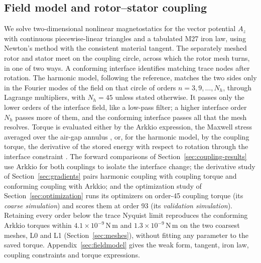 \documentclass{anvil-paper}
\begin{document}
\subsection{Field model and rotor--stator coupling}
We solve two-dimensional nonlinear magnetostatics for the vector potential
$A_z$ with continuous piecewise-linear triangles and a tabulated M27 iron
law, using Newton's method with the consistent material tangent. The
separately meshed rotor and stator meet on the coupling circle, across
which the rotor mesh turns, in one of two ways. A conforming interface
identifies matching trace nodes after rotation. The harmonic model,
following the reference, matches the two sides only in the Fourier modes
of the field on that circle of orders $n=3,9,\ldots,N_h$, through Lagrange
multipliers, with $N_h=45$ unless stated otherwise. It passes only the
lower orders of the interface field, like a low-pass filter; a higher
interface order $N_h$ passes more of them, and the conforming interface
passes all that the mesh resolves. Torque is evaluated either by the
Arkkio expression, the Maxwell stress averaged over the air-gap annulus
\citep{arkkio1987}, or, for the harmonic model, by the coupling torque, the
derivative of the stored energy with respect to rotation through the
interface constraint \citep{egger2022torque}. The forward comparisons of
Section~\ref{sec:coupling-results} use Arkkio for both couplings to
isolate the interface change; the derivative study of
Section~\ref{sec:gradients} pairs harmonic coupling with coupling torque
and conforming coupling with Arkkio; and the optimization study of
Section~\ref{sec:optimization} runs its optimizers on order-45 coupling
torque (its \emph{coarse simulation}) and scores them at order 93 (its
\emph{validation simulation}). Retaining every order below the trace
Nyquist limit reproduces the conforming Arkkio torques within
$4.1\times10^{-9}$\,N\,m and $1.3\times10^{-9}$\,N\,m on the two coarsest
meshes, L0 and L1 (Section~\ref{sec:meshes}), without fitting any
parameter to the saved torque. Appendix~\ref{sec:fieldmodel} gives the
weak form, tangent, iron law, coupling constraints and torque expressions.
\end{document}
